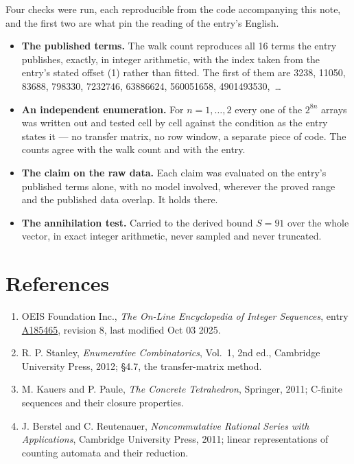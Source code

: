 \documentclass[11pt]{article}
\theoremstyle{definition}
\begin{document}
Four checks were run, each reproducible from the code accompanying this note, and the first two are what pin the reading of the entry's English.

\begin{itemize}

\item {\bfseries The published terms.} The walk count reproduces all 16 terms the entry publishes, exactly, in integer arithmetic, with the index taken from the entry's stated offset (1) rather than fitted. The first of them are 3238, 11050, 83688, 798330, 7232746, 63886624, 560051658, 4901493530,~\dots

\item {\bfseries An independent enumeration.} For $n = 1,\dots,2$ every one of the $2^{8n}$ arrays was written out and tested cell by cell against the condition as the entry states it --- no transfer matrix, no row window, a separate piece of code. The counts agree with the walk count and with the entry.

\item {\bfseries The claim on the raw data.} Each claim was evaluated on the entry's published terms alone, with no model involved, wherever the proved range and the published data overlap. It holds there.

\item {\bfseries The annihilation test.} Carried to the derived bound $S = 91$ over the whole vector, in exact integer arithmetic, never sampled and never truncated.

\end{itemize}

\section{References}

\begin{enumerate}

\item OEIS Foundation Inc., \emph{The On-Line Encyclopedia of Integer Sequences}, entry \href{https://oeis.org/A185465}{A185465}, revision 8, last modified Oct 03 2025.

\item R. P. Stanley, \emph{Enumerative Combinatorics}, Vol.~1, 2nd ed., Cambridge University Press, 2012; \S4.7, the transfer-matrix method.

\item M. Kauers and P. Paule, \emph{The Concrete Tetrahedron}, Springer, 2011; C-finite sequences and their closure properties.

\item J. Berstel and C. Reutenauer, \emph{Noncommutative Rational Series with Applications}, Cambridge University Press, 2011; linear representations of counting automata and their reduction.

\end{enumerate}
\end{document}

